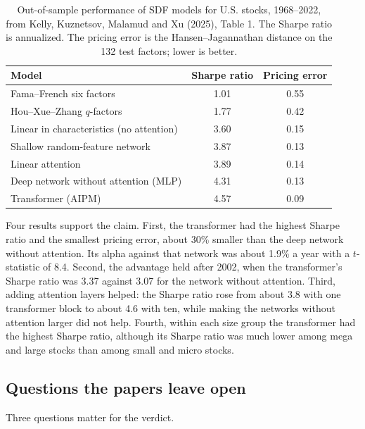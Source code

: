 \begin{table}[htbp]
\centering
\small
\caption{Out-of-sample performance of SDF models for U.S. stocks, 1968--2022, from Kelly, Kuznetsov, Malamud and Xu (2025), Table 1. The Sharpe ratio is annualized. The pricing error is the Hansen--Jagannathan distance on the 132 test factors; lower is better.}
\label{tab:20-aipm}
\begin{tabular}{@{}lcc@{}}
\toprule
Model & Sharpe ratio & Pricing error \\
\midrule
Fama--French six factors & 1.01 & 0.55 \\
Hou--Xue--Zhang $q$-factors & 1.77 & 0.42 \\
Linear in characteristics (no attention) & 3.60 & 0.15 \\
Shallow random-feature network & 3.87 & 0.13 \\
Linear attention & 3.89 & 0.14 \\
Deep network without attention (MLP) & 4.31 & 0.13 \\
Transformer (AIPM) & 4.57 & 0.09 \\
\bottomrule
\end{tabular}
\end{table}

Four results support the claim. First, the transformer had the highest Sharpe ratio and the smallest pricing error, about 30\% smaller than the deep network without attention. Its alpha against that network was about 1.9\% a year with a $t$-statistic of 8.4. Second, the advantage held after 2002, when the transformer's Sharpe ratio was 3.37 against 3.07 for the network without attention. Third, adding attention layers helped: the Sharpe ratio rose from about 3.8 with one transformer block to about 4.6 with ten, while making the networks without attention larger did not help. Fourth, within each size group the transformer had the highest Sharpe ratio, although its Sharpe ratio was much lower among mega and large stocks than among small and micro stocks.

\subsection{Questions the papers leave open}

Three questions matter for the verdict.

